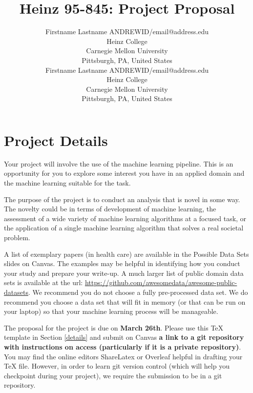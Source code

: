 \documentclass[twoside,11pt]{article}
\begin{document}
\title{Heinz 95-845: Project Proposal}

\author{\name Firstname Lastname \email ANDREWID/email@address.edu \\
       \addr Heinz College\\
       Carnegie Mellon University\\
       Pittsburgh, PA, United States \\
       \AND
       \name Firstname Lastname \email ANDREWID/email@address.edu \\
       \addr Heinz College\\
       Carnegie Mellon University\\
       Pittsburgh, PA, United States}
\maketitle


\section{Project Details}
Your project will involve the use of the machine learning pipeline. This is an opportunity for you to explore some interest you have in an applied domain and the machine learning suitable for the task.

The purpose of the project is to conduct an analysis that is novel in some way. The novelty could be in terms of development of machine learning, the assessment of a wide variety of machine learning algorithms at a focused task, or the application of a single machine learning algorithm that solves a real societal problem.

A list of exemplary papers (in health care) are available in the Possible Data Sets slides on Canvas. The examples may be helpful in identifying how you conduct your study and prepare your write-up. A much larger list of public domain data sets is available at the url: \url{https://github.com/awesomedata/awesome-public-datasets}. We recommend you do not choose a fully pre-processed data set. We do recommend you choose a data set that will fit in memory (or that can be run on your laptop) so that your machine learning process will be manageable.

The proposal for the project is due on \textbf{March 26th}. Please use this TeX template in Section \ref{details} and submit on Canvas \textbf{a link to a git repository with instructions on access (particularly if it is a private repository)}. You may find the online editors ShareLatex or Overleaf helpful in drafting your TeX file. However, in order to learn git version control (which will help you checkpoint during your project), we require the submission to be in a git repository.
\end{document}
